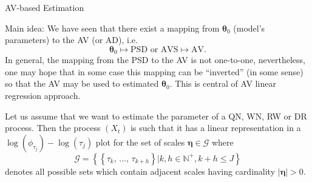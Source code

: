 \documentclass[envcountsect,usenames,dvipsnames]{beamer}
\def\btheta{\bm \theta}
\theoremstyle{mystyle}
\begin{document}
\begin{frame}{AV-based Estimation}
  \small  
    \begin{alertblock}{Main idea:}
    We have seen that there exist a mapping from $\bm{\theta}_0$ (model's parameters) to the AV (or AD), i.e.
    \begin{equation*}
        \bm{\theta}_0 \mapsto \text{PSD or AVS} \mapsto \text{AV}.
    \end{equation*}
    In general, the mapping from the PSD to the AV is not one-to-one, nevertheless, one may hope that in some case this mapping can be ``inverted'' (in some sense) so that the AV may be used to estimated $\btheta_0$. This is central of AV linear regression approach.
    \end{alertblock}
    
    Let us assume that we want to estimate the parameter of a QN, WN, RW or DR process. Then the process $(X_t)$ is such that it has a linear representation in a $\log ( \phi_{\tau_j} ) - \log\left( \tau_j \right)$ plot for the set of scales $\bm{\eta} \in \bm{\mathcal{G}}$ where 
%
\begin{equation*}
	\bm{\mathcal{G}} = \left\{ \left\{\tau_k, \, ...,\, \tau_{k + h} \right\} | k,h \in \mathbb{N}^{+}, k + h \leq J\right\}
\end{equation*}
%
denotes all possible sets which contain adjacent scales having cardinality $|\bm{\eta}| > 0$. 
\end{frame}
\end{document}
